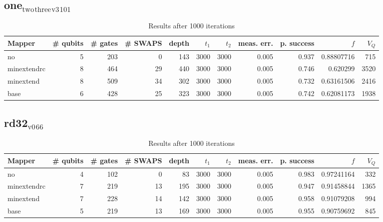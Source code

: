 \documentclass[11pt]{article}
\begin{document}
\subsection{one\(_{\text{two}}\)\(_{\text{three}}\)\(_{\text{v3}}\)\(_{\text{101}}\)}
\label{sec:org01c331f}
\begin{table}[!htpb]
\caption{\label{tab:org15650f7}
Results after 1000 iterations}
\centering
\begin{tabular}{lrrrrrrrrrr}
\hline
Mapper & \# qubits & \# gates & \# SWAPS & depth & \(t_1\) & \(t_2\) & meas. err. & p. success & \(f\) & \(V_Q\)\\
\hline
no & 5 & 203 & 0 & 143 & 3000 & 3000 & 0.005 & 0.937 & 0.88807716 & 715\\
\hline
minextendrc & 8 & 464 & 29 & 440 & 3000 & 3000 & 0.005 & 0.746 & 0.620299 & 3520\\
minextend & 8 & 509 & 34 & 302 & 3000 & 3000 & 0.005 & 0.732 & 0.63161506 & 2416\\
base & 6 & 428 & 25 & 323 & 3000 & 3000 & 0.005 & 0.742 & 0.62081173 & 1938\\
\hline
\end{tabular}
\end{table}
\subsection{rd32\(_{\text{v0}}\)\(_{\text{66}}\)}
\label{sec:org195239b}
\begin{table}[!htpb]
\caption{\label{tab:orgb0ae9b0}
Results after 1000 iterations}
\centering
\begin{tabular}{lrrrrrrrrrr}
\hline
Mapper & \# qubits & \# gates & \# SWAPS & depth & \(t_1\) & \(t_2\) & meas. err. & p. success & \(f\) & \(V_Q\)\\
\hline
no & 4 & 102 & 0 & 83 & 3000 & 3000 & 0.005 & 0.983 & 0.97241164 & 332\\
\hline
minextendrc & 7 & 219 & 13 & 195 & 3000 & 3000 & 0.005 & 0.947 & 0.91458844 & 1365\\
minextend & 7 & 228 & 14 & 142 & 3000 & 3000 & 0.005 & 0.958 & 0.91079208 & 994\\
base & 5 & 219 & 13 & 169 & 3000 & 3000 & 0.005 & 0.955 & 0.90759692 & 845\\
\hline
\end{tabular}
\end{table}
\end{document}
